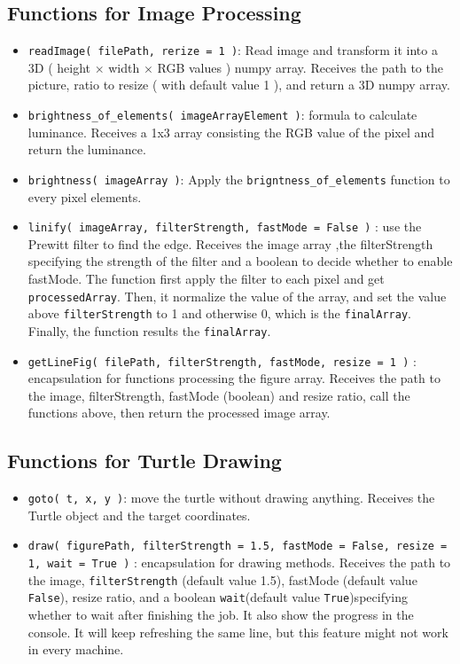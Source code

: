 \documentclass{article}
\providecommand{\tightlist}{%
  \setlength{\itemsep}{0pt}\setlength{\parskip}{0pt}}
\begin{document}
\subsection{Functions for Image Processing}

\begin{itemize}
\tightlist
\item
  \texttt{readImage(\ filePath,\ rerize\ =\ 1\ )}: Read image and
  transform it into a 3D ( height $\times$ width $\times$ RGB values ) numpy array.
  Receives the path to the picture, ratio to resize ( with default value
  1 ), and return a 3D numpy array.
\item
  \texttt{brightness\_of\_elements(\ imageArrayElement\ )}: formula to
  calculate luminance. Receives a 1x3 array consisting the RGB value of
  the pixel and return the luminance.
\item
  \texttt{brightness(\ imageArray\ )}: Apply the
  \texttt{brigntness\_of\_elements} function to every pixel elements.
\item
  \texttt{linify(\ imageArray,\ filterStrength,\ fastMode\ =\ False\ )}
  : use the Prewitt filter to find the edge. Receives the image array
  ,the filterStrength specifying the strength of the filter and a
  boolean to decide whether to enable fastMode. The function first apply
  the filter to each pixel and get \texttt{processedArray}. Then, it
  normalize the value of the array, and set the value above
  \texttt{filterStrength} to 1 and otherwise 0, which is the
  \texttt{finalArray}. Finally, the function results the
  \texttt{finalArray}.
\item
  \texttt{getLineFig(\ filePath,\ filterStrength,\ fastMode,\ resize\ =\ 1\ )}
  : encapsulation for functions processing the figure array. Receives
  the path to the image, filterStrength, fastMode (boolean) and resize
  ratio, call the functions above, then return the processed image
  array.
\end{itemize}

\subsection{Functions for Turtle Drawing}

\begin{itemize}
\tightlist
\item
  \texttt{goto(\ t,\ x,\ y\ )}: move the turtle without drawing
  anything. Receives the Turtle object and the target coordinates.
\item
  \texttt{draw(\ figurePath,\ filterStrength\ =\ 1.5,\ fastMode\ =\ False,\ resize\ =\ 1,\ wait\ =\ True\ )}
  : encapsulation for drawing methods. Receives the path to the image,
  \texttt{filterStrength} (default value 1.5), fastMode (default value
  \texttt{False}), resize ratio, and a boolean \texttt{wait}(default
  value \texttt{True})specifying whether to wait after finishing the
  job. It also show the progress in the console. It will keep refreshing
  the same line, but this feature might not work in every machine.
\end{itemize}
\end{document}
